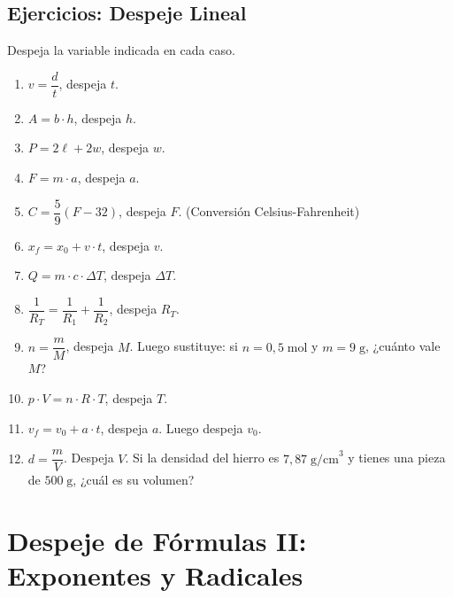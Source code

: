 \documentclass[12pt, a4paper]{article}
\begin{document}
\subsection{Ejercicios: Despeje Lineal}
Despeja la variable indicada en cada caso.

\begin{enumerate}[leftmargin=*]
  \item \facil{} $v = \dfrac{d}{t}$, despeja $t$.

  \item \facil{} $A = b \cdot h$, despeja $h$.

  \item \facil{} $P = 2\ell + 2w$, despeja $w$.

  \item \facil{} $F = m \cdot a$, despeja $a$.

  \item \medio{} $C = \dfrac{5}{9}(F - 32)$, despeja $F$. (Conversión Celsius-Fahrenheit)

  \item \medio{} $x_f = x_0 + v \cdot t$, despeja $v$.

  \item \medio{} $Q = m \cdot c \cdot \Delta T$, despeja $\Delta T$.

  \item \medio{} $\dfrac{1}{R_T} = \dfrac{1}{R_1} + \dfrac{1}{R_2}$, despeja $R_T$.

  \item \dificil{} $n = \dfrac{m}{M}$, despeja $M$. Luego sustituye: si $n = 0{,}5\;\text{mol}$ y $m = 9\;\text{g}$, ¿cuánto vale $M$?

  \item \dificil{} $p \cdot V = n \cdot R \cdot T$, despeja $T$.

  \item \dificil{} $v_f = v_0 + a \cdot t$, despeja $a$. Luego despeja $v_0$.

  \item \dificil{} $d = \dfrac{m}{V}$. Despeja $V$. Si la densidad del hierro es $7{,}87\;\text{g/cm}^3$ y tienes una pieza de $500\;\text{g}$, ¿cuál es su volumen?
\end{enumerate}

\newpage

\section{Despeje de Fórmulas II: Exponentes y Radicales}
\end{document}
